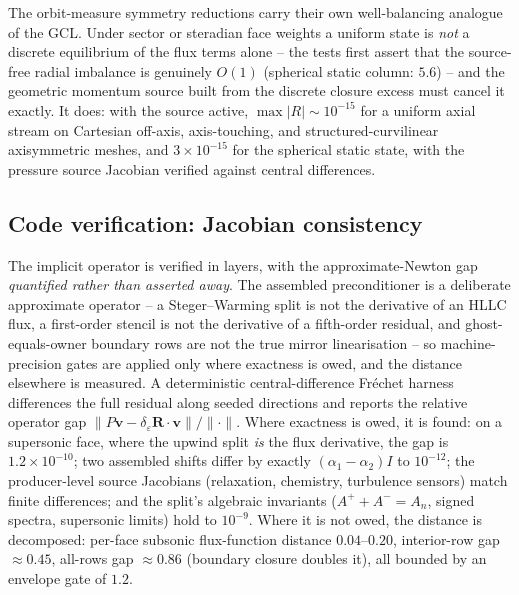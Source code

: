 \documentclass[journal,biblatex]{new-aiaa}
\begin{document}
The orbit-measure symmetry reductions carry their own well-balancing analogue of the GCL. Under sector or steradian face weights a uniform state is \emph{not} a discrete equilibrium of the flux terms alone -- the tests first assert that the source-free radial imbalance is genuinely $O(1)$ (spherical static column: $5.6$) -- and the geometric momentum source built from the discrete closure excess must cancel it exactly. It does: with the source active, $\max|R|\sim10^{-15}$ for a uniform axial stream on Cartesian off-axis, axis-touching, and structured-curvilinear axisymmetric meshes, and $3\times10^{-15}$ for the spherical static state, with the pressure source Jacobian verified against central differences.

\subsection{Code verification: Jacobian consistency}
\label{sec:vv-jac}

The implicit operator is verified in layers, with the approximate-Newton gap \emph{quantified rather than asserted away}. The assembled preconditioner is a deliberate approximate operator -- a Steger--Warming split is not the derivative of an HLLC flux, a first-order stencil is not the derivative of a fifth-order residual, and ghost-equals-owner boundary rows are not the true mirror linearisation -- so machine-precision gates are applied only where exactness is owed, and the distance elsewhere is measured. A deterministic central-difference Fr\'echet harness differences the full residual along seeded directions and reports the relative operator gap $\lVert P\mathbf{v}-\delta_\varepsilon\mathbf{R}\cdot\mathbf{v}\rVert/\lVert\cdot\rVert$. Where exactness is owed, it is found: on a supersonic face, where the upwind split \emph{is} the flux derivative, the gap is $1.2\times10^{-10}$; two assembled shifts differ by exactly $(\alpha_1-\alpha_2)I$ to $10^{-12}$; the producer-level source Jacobians (relaxation, chemistry, turbulence sensors) match finite differences; and the split's algebraic invariants ($A^++A^-=A_n$, signed spectra, supersonic limits) hold to $10^{-9}$. Where it is not owed, the distance is decomposed: per-face subsonic flux-function distance $0.04$--$0.20$, interior-row gap $\approx0.45$, all-rows gap $\approx0.86$ (boundary closure doubles it), all bounded by an envelope gate of $1.2$.
\end{document}
